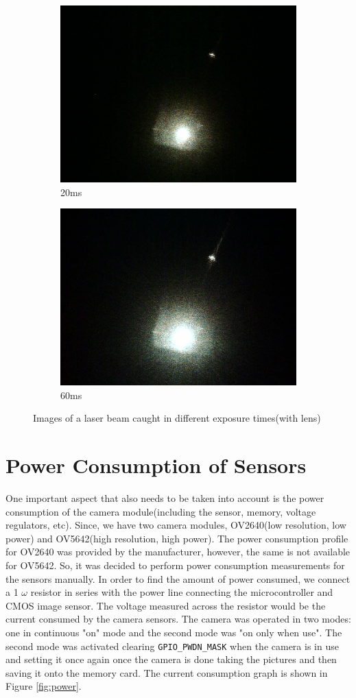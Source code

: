 \begin{figure}[ht]
        \begin{subfigure}{0.5\textwidth}
    \centering
        \includegraphics[width=0.5\linewidth]{pics/exposure/20ms}
        \caption{20ms}
        \label{fig:exp20ms}
    \end{subfigure}%
    \begin{subfigure}{0.5\textwidth}
    \centering
        \includegraphics[width=0.5\linewidth]{pics/exposure/60ms}
        \caption{60ms}
        \label{fig:exp60ms}
        
    \end{subfigure}    
    \caption{Images of a laser beam caught in different exposure times(with lens)}
    \label{fig:exptests}
    \end{figure}
    
\section{Power Consumption of Sensors}
 One important aspect that also needs to be taken into account is the power consumption of the camera module(including the sensor, memory, voltage regulators, etc). Since, we have two camera modules, OV2640(low resolution, low power) and OV5642(high resolution, high power). The power consumption profile for OV2640 was provided by the manufacturer, however, the same is not available for OV5642. So, it was decided to perform power consumption measurements for the sensors manually. In order to find the amount of power consumed, we connect a 1 $\omega$ resistor in series with the power line connecting the microcontroller and CMOS image sensor. The voltage measured across the resistor would be the current consumed by the camera sensors. The camera was operated in two modes: one in continuous "on" mode and the second mode was "on only when use". The second mode was activated clearing \texttt{GPIO\_PWDN\_MASK} when the camera is in use and setting it once again once the camera is done taking the pictures and then saving it onto the memory card. The current consumption graph is shown in Figure \ref{fig:power}.
 
